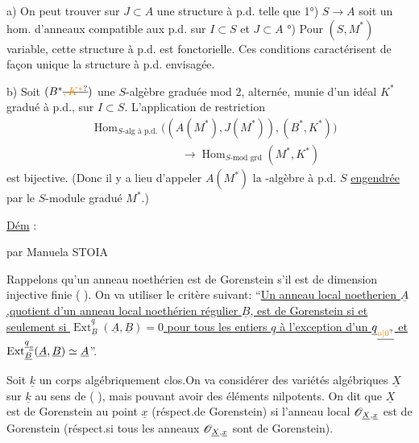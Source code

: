 a) On peut trouver sur  $J\subset A$ une structure à p.d. telle que 1°) $S\longrightarrow A$ soit un hom. d'anneaux compatible aux p.d. sur $I\subset S$ et $J\subset A$ °) Pour $(S,M^\ast)$ variable, cette structure à p.d. est fonctorielle. Ces conditions caractérisent de façon unique la structure à p.d. envisagée.

b) Soit $(B^\ast\deleted{\unsure{,K^\ast}})$ une $S$-algèbre graduée mod $2$,  alternée, munie d'un idéal $K^\ast$ gradué à p.d.,   sur $I\subset S$.
L'application de restriction
\[
\begin{aligned}
&\operatorname{Hom}_{S\text{-alg à p.d.}}\bigl((A(M^\ast),J(M^\ast)),(B^\ast,K^\ast)\bigr)\\
&\hspace{8em}\longrightarrow\operatorname{Hom}_{S\text{-mod grd}}(M^\ast,K^\ast)
\end{aligned}
\]
est bijective. (Donc il y a lieu d'appeler $A(M^\ast)$
la -algèbre  à p.d.  $S$ \uline{engendrée} par le $S$-module gradué $M^\ast$.)

\uline{Dém} :

\begin{center}

par Manuela STOIA\end{center}

Rappelons qu'un anneau noethérien est de Gorenstein s'il est de dimension injective finie (  ). On va utiliser
le critère suivant: ``\uline{Un anneau local noetherien $\underline A$,quotient d'un anneau local noethérien régulier $\underline B$, est de Gorenstein
si et seulement si $\operatorname{Ext}^{\underline q}_{\underline B}(\underline A,\underline B)=0$ pour tous les entiers $\underline q$ à
l'exception d'un $\underline q_{\underline{\unsure{o|0}}}$ et $\operatorname{Ext}^{\underline q_{\underline o}}_{\underline B}(\underline A,\underline B)\simeq\underline A$}''.

Soit $\underline k$ un corps algébriquement clos.On va considérer des variétés algébriques $\underline X$ sur $\underline k$ au sens de (  ), mais pouvant avoir des éléments nilpotents.
On dit que $\underline X$ est de Gorenstein
au point $\underline x$ (réspect.de Gorenstein) si l'anneau
local $\mathscr O_{\underline X,\underline x}$ est de Gorenstein (réspect.si tous les anneaux $\mathscr O_{\underline X,\underline x}$ sont de Gorenstein).

